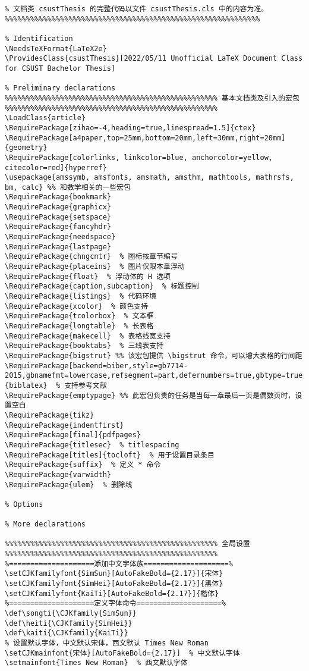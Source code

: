 \begin{lstlisting}[numbers=none,frame=none]
%%%%%%%%%%%%%%%%%%%%%%%%%%%%%%%%%%%%%%%%%%%%%%%%%%%%%%%%%%%%
% 文档类 csustThesis 的完整代码以文件 csustThesis.cls 中的内容为准。
%%%%%%%%%%%%%%%%%%%%%%%%%%%%%%%%%%%%%%%%%%%%%%%%%%%%%%%%%%%%

% Identification
\NeedsTeXFormat{LaTeX2e}
\ProvidesClass{csustThesis}[2022/05/11 Unofficial LaTeX Document Class for CSUST Bachelor Thesis]

% Preliminary declarations
%%%%%%%%%%%%%%%%%%%%%%%%%%%%%%%%%%%%%%%%%%%%%%%%%% 基本文档类及引入的宏包 %%%%%%%%%%%%%%%%%%%%%%%%%%%%%%%%%%%%%%%%%%%%%%%%%%
\LoadClass{article}
\RequirePackage[zihao=-4,heading=true,linespread=1.5]{ctex}
\RequirePackage[a4paper,top=25mm,bottom=20mm,left=30mm,right=20mm]{geometry}
\RequirePackage[colorlinks, linkcolor=blue, anchorcolor=yellow, citecolor=red]{hyperref}
\usepackage{amssymb, amsfonts, amsmath, amsthm, mathtools, mathrsfs, bm, calc} %% 和数学相关的一些宏包
\RequirePackage{bookmark}
\RequirePackage{graphicx}
\RequirePackage{setspace}
\RequirePackage{fancyhdr}
\RequirePackage{needspace}
\RequirePackage{lastpage}
\RequirePackage{chngcntr}  % 图标按章节编号
\RequirePackage{placeins}  % 图片仅限本章浮动
\RequirePackage{float}  % 浮动体的 H 选项
\RequirePackage{caption,subcaption}  % 标题控制
\RequirePackage{listings}  % 代码环境
\RequirePackage{xcolor}  % 颜色支持
\RequirePackage{tcolorbox}  % 文本框
\RequirePackage{longtable}  % 长表格
\RequirePackage{makecell}  % 表格线宽支持
\RequirePackage{booktabs}  % 三线表支持
\RequirePackage{bigstrut} %% 该宏包提供 \bigstrut 命令，可以增大表格的行间距
\RequirePackage[backend=biber,style=gb7714-2015,gbnamefmt=lowercase,refsegment=part,defernumbers=true,gbtype=true,]{biblatex}  % 支持参考文献
\RequirePackage{emptypage} %% 此宏包负责的任务是当每一章最后一页是偶数页时，设置空白
\RequirePackage{tikz}
\RequirePackage{indentfirst}
\RequirePackage[final]{pdfpages}
\RequirePackage{titlesec}  % titlespacing
\RequirePackage[titles]{tocloft}  % 用于设置目录条目
\RequirePackage{suffix}  % 定义 * 命令
\RequirePackage{varwidth}  
\RequirePackage{ulem}  % 删除线  

% Options

% More declarations

%%%%%%%%%%%%%%%%%%%%%%%%%%%%%%%%%%%%%%%%%%%%%%%%%% 全局设置 %%%%%%%%%%%%%%%%%%%%%%%%%%%%%%%%%%%%%%%%%%%%%%%%%%
%====================添加中文字体族====================%
\setCJKfamilyfont{SimSun}[AutoFakeBold={2.17}]{宋体}
\setCJKfamilyfont{SimHei}[AutoFakeBold={2.17}]{黑体}
\setCJKfamilyfont{KaiTi}[AutoFakeBold={2.17}]{楷体}
%====================定义字体命令====================%
\def\songti{\CJKfamily{SimSun}}
\def\heiti{\CJKfamily{SimHei}}
\def\kaiti{\CJKfamily{KaiTi}}
% 设置默认字体，中文默认宋体，西文默认 Times New Roman
\setCJKmainfont{宋体}[AutoFakeBold={2.17}]  % 中文默认字体
\setmainfont{Times New Roman}  % 西文默认字体


\end{lstlisting}
